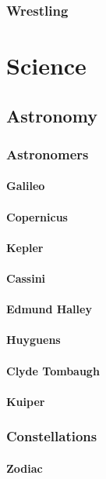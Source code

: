 \documentclass[12pt]{book}
\begin{document}
		\subsection{Wrestling}



\chapter{Science}
	\section{Astronomy}
		\subsection{Astronomers}
			\subsubsection{Galileo}
			\subsubsection{Copernicus}
			\subsubsection{Kepler}
			\subsubsection{Cassini}
			\subsubsection{Edmund Halley}
			\subsubsection{Huyguens}
			\subsubsection{Clyde Tombaugh}
			\subsubsection{Kuiper}
			
		\subsection{Constellations}
			\subsubsection{Zodiac}
\end{document}
